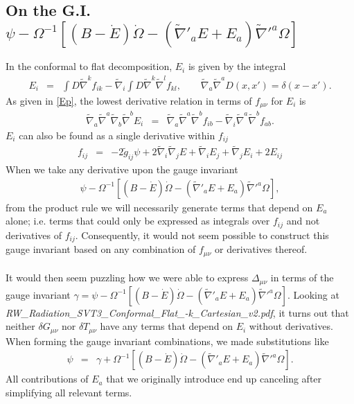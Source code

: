 \documentclass[10pt,letterpaper]{article}
\numberwithin{equation}{section}
\begin{document}
\subsection{On the G.I. $\psi- \Omega^{-1}[(B-\dot E)\dot\Omega- (\tilde\nabla'_a E + E_a)\tilde\nabla'^a\Omega]$ }
In the conformal to flat decomposition, $E_i$ is given by the integral
\begin{eqnarray}
E_i &=& \int D \tilde\nabla^k f_{ik} - \tilde\nabla_i \int D \tilde\nabla^k \tilde\nabla^l f_{kl},\qquad \tilde\nabla_a\tilde\nabla^a D(x,x') = \delta(x-x').
\end{eqnarray}
As given in \eqref{Ep}, the lowest derivative relation in terms of $f_{\mu\nu}$ for $E_i$ is
\begin{eqnarray}
\tilde\nabla_a\tilde\nabla^a \tilde\nabla_b\tilde\nabla^b E_i &=&
\tilde\nabla_a\tilde\nabla^a \tilde\nabla^b f_{ib} - \tilde\nabla_i \tilde\nabla^a\tilde\nabla^b f_{ab}.
\end{eqnarray}
$E_i$ can also be found as a single derivative within $f_{ij}$
\begin{eqnarray}
f_{ij}&=& -2\tilde g_{ij}\psi + 2\tilde\nabla_i\tilde\nabla_j E + \tilde\nabla_i E_j + \tilde\nabla_j E_i + 2E_{ij}
\end{eqnarray}
When we take any derivative upon the gauge invariant
\begin{eqnarray}
\psi- \Omega^{-1}[(B-\dot E)\dot\Omega- (\tilde\nabla'_a E + E_a)\tilde\nabla'^a\Omega],
\end{eqnarray}
from the product rule we will necessarily generate terms that depend on $E_a$ alone; i.e. terms that could only be expressed as integrals over $f_{ij}$ and not derivatives of $f_{ij}$. Consequently, it would not seem possible to construct this gauge invariant based on any combination of $f_{\mu\nu}$ or derivatives thereof. 
\\ \\
It would then seem puzzling how we were able to express $\Delta_{\mu\nu}$ in terms of the gauge invariant $\gamma=\psi- \Omega^{-1}[(B-\dot E)\dot\Omega- (\tilde\nabla'_a E + E_a)\tilde\nabla'^a\Omega]$. Looking at \emph{RW\_Radiation\_SVT3\_Conformal\_Flat\_-k\_Cartesian\_v2.pdf}, it turns out that neither $\delta G_{\mu\nu}$ nor $\delta T_{\mu\nu}$ have any terms that depend on $E_i$ without derivatives. When forming the gauge invariant combinations, we made substitutions like
\begin{eqnarray}
\psi &=& \gamma + \Omega^{-1}[(B-\dot E)\dot\Omega- (\tilde\nabla'_a E + E_a)\tilde\nabla'^a\Omega].
\end{eqnarray}
All contributions of $E_a$ that we originally introduce end up canceling after simplifying all relevant terms.
\end{document}
